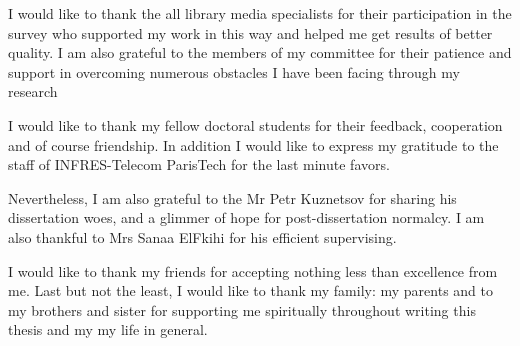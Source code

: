 \begin{acknowledgements}
I would like to thank the all library media specialists for their participation in the survey who supported my work in this way and helped me get results of better quality. I am also grateful to the members of my committee for their patience and support in overcoming numerous obstacles I have been facing through my research

I would like to thank my fellow doctoral students for their feedback, cooperation and of course friendship. In addition I would like to express my gratitude to the staff of INFRES-Telecom ParisTech for  the last minute favors.

Nevertheless, I am also grateful to the Mr Petr Kuznetsov for sharing his dissertation woes, and a glimmer of hope for post-dissertation normalcy. I am also thankful to Mrs Sanaa ElFkihi for his efficient supervising.

I would like to thank my friends for accepting nothing less than excellence from me. Last but not the least, I would like to thank my family: my parents and to my brothers and sister for supporting me spiritually throughout writing this thesis and my my life in general.
\end{acknowledgements}